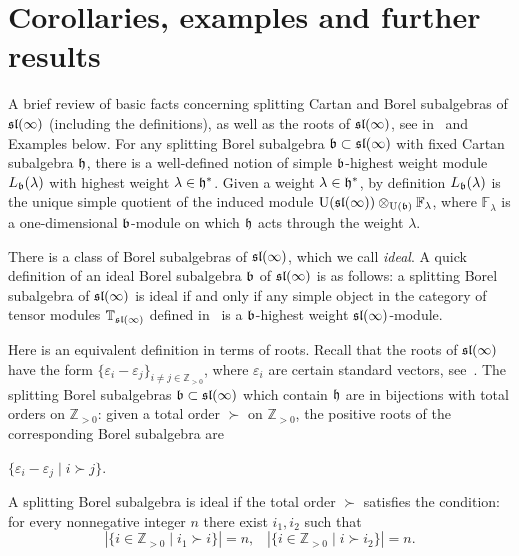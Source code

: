 \documentclass[10pt]{amsart}\oddsidemargin -1mm \evensidemargin -1mm \topmargin -15mm\headheight5mm \headsep 3.5mm \textheight 245mm\textwidth 170mm %
\begin{document}
\section{Corollaries, examples and further results}
A brief review of basic facts concerning  splitting Cartan and Borel subalgebras of $\frak{sl}(\infty)$ (including the definitions), as well as the roots of $\frak{sl}(\infty)$, see in~\cite{PP3} and Examples below. For any splitting Borel subalgebra $\frak b\subset\frak{sl}(\infty)$ with fixed Cartan subalgebra $\frak h$, there is a well-defined notion of simple $\frak b$-highest weight module $L_\frak b(\lambda)$ with highest weight $\lambda\in\frak h^*$. Given a weight $\lambda\in\frak h^*$, by definition $L_\frak b(\lambda)$ is the unique simple quotient of the induced module $\operatorname{\mathrm{U}}(\frak{sl}(\infty))\otimes_{\operatorname{\mathrm{U}}(\frak  b)}\mathbb F_\lambda$, where $\mathbb F_\lambda$ is a one-dimensional $\frak b$-module on which $\frak h$ acts through the weight $\lambda$.

There is a class of Borel subalgebras of $\frak{sl}(\infty)$, which we call {\it ideal}. %
A quick definition of an ideal Borel subalgebra $\frak b$ of $\frak{sl}(\infty)$ is as follows: a splitting Borel subalgebra of $\frak{sl}(\infty)$ is ideal if and only if any simple object in the category of tensor modules $\mathbb T_{\frak{sl}(\infty)}$ defined in~\cite{DPS} is a $\frak b$-highest weight $\frak{sl}(\infty)$-module.

Here is an equivalent definition in terms of roots. Recall that the roots of $\frak{sl}(\infty)$ have the form $\{\varepsilon_i-\varepsilon_j\}_{i\ne j\in\mathbb Z_{>0}}$, where $\varepsilon_i$ are certain standard vectors, see~\cite[Appendix~A]{PP3}. 
The splitting Borel subalgebras $\frak b\subset\frak{sl}(\infty)$ which contain $\frak h$ are in bijections with total orders on $\mathbb Z_{>0}$: given a total order $\succ$ on $\mathbb Z_{>0}$, the positive roots of the corresponding Borel subalgebra are
\begin{center}$\{\varepsilon_i-\varepsilon_j\mid i\succ j\}$.\end{center}
A splitting Borel subalgebra is ideal if the total order $\succ$ satisfies the condition: for every nonnegative integer $n$ there exist $i_1, i_2$ such that
$$|\{i\in\mathbb Z_{>0}\mid i_1\succ i\}|=n,\hspace{10pt}|\{i\in\mathbb Z_{>0}\mid i\succ i_2\}|=n.$$
\end{document}
